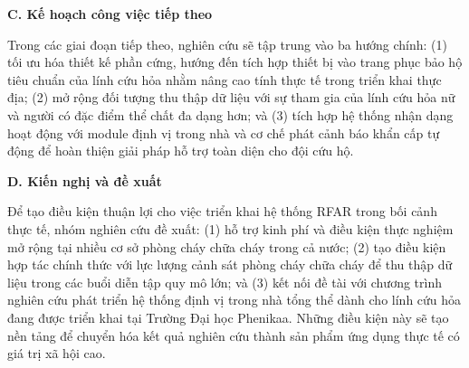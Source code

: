 \textbf{C. Kế hoạch công việc tiếp theo}

Trong các giai đoạn tiếp theo, nghiên cứu sẽ tập trung vào ba hướng chính: (1) tối ưu hóa thiết kế phần cứng, hướng đến tích hợp thiết bị vào trang phục bảo hộ tiêu chuẩn của lính cứu hỏa nhằm nâng cao tính thực tế trong triển khai thực địa; (2) mở rộng đối tượng thu thập dữ liệu với sự tham gia của lính cứu hỏa nữ và người có đặc điểm thể chất đa dạng hơn; và (3) tích hợp hệ thống nhận dạng hoạt động với module định vị trong nhà và cơ chế phát cảnh báo khẩn cấp tự động để hoàn thiện giải pháp hỗ trợ toàn diện cho đội cứu hộ.

\textbf{D. Kiến nghị và đề xuất}

Để tạo điều kiện thuận lợi cho việc triển khai hệ thống RFAR trong bối cảnh thực tế, nhóm nghiên cứu đề xuất: (1) hỗ trợ kinh phí và điều kiện thực nghiệm mở rộng tại nhiều cơ sở phòng cháy chữa cháy trong cả nước; (2) tạo điều kiện hợp tác chính thức với lực lượng cảnh sát phòng cháy chữa cháy để thu thập dữ liệu trong các buổi diễn tập quy mô lớn; và (3) kết nối đề tài với chương trình nghiên cứu phát triển hệ thống định vị trong nhà tổng thể dành cho lính cứu hỏa đang được triển khai tại Trường Đại học Phenikaa. Những điều kiện này sẽ tạo nền tảng để chuyển hóa kết quả nghiên cứu thành sản phẩm ứng dụng thực tế có giá trị xã hội cao.